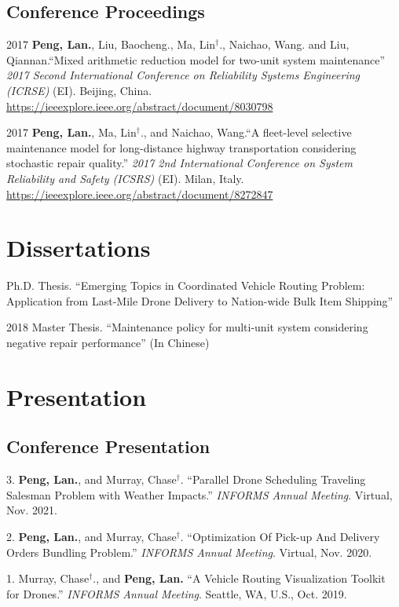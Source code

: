 \documentclass[12pt,letterpaper]{report}
\begin{document}
    \subsection*{Conference Proceedings}
    \begin{tablist}
        \item[2017] \tab{}\textbf{Peng, Lan.}, Liu, Baocheng., Ma, Lin$^\dagger$., Naichao, Wang. and Liu, Qiannan.\enquote{Mixed arithmetic reduction model for two-unit system maintenance} \textit{2017 Second International Conference on Reliability Systems Engineering (ICRSE)} (EI). Beijing, China. \href{https://ieeexplore.ieee.org/abstract/document/8030798}{https://ieeexplore.ieee.org/abstract/document/8030798}
        
        \item[2017] \tab{}\textbf{Peng, Lan.}, Ma, Lin$^\dagger$., and Naichao, Wang.\enquote{A fleet-level selective maintenance model for long-distance highway transportation considering stochastic repair quality.} \textit{2017 2nd International Conference on System Reliability and Safety (ICSRS)} (EI). Milan, Italy. \href{https://ieeexplore.ieee.org/abstract/document/8272847}{https://ieeexplore.ieee.org/abstract/document/8272847}
    \end{tablist}

    \section*{Dissertations}
    \begin{tablist}
        \item[\the\year] \tab{} Ph.D. Thesis. \enquote{Emerging Topics in Coordinated Vehicle Routing Problem: Application from Last-Mile Drone Delivery to Nation-wide Bulk Item Shipping}
        \item[2018] \tab{} Master Thesis. \enquote{Maintenance policy for multi-unit system considering negative repair performance} (In Chinese)
    \end{tablist}

    \section*{Presentation}
    \subsection*{Conference Presentation}
    \begin{tablist}
        \item[3.] \tab{}\textbf{Peng, Lan.}, and Murray, Chase$^\dagger$. \enquote{Parallel Drone Scheduling Traveling Salesman Problem with Weather Impacts.} \textit{INFORMS Annual Meeting}. Virtual, Nov. 2021.
        \item[2.] \tab{}\textbf{Peng, Lan.}, and Murray, Chase$^\dagger$. \enquote{Optimization Of Pick-up And Delivery Orders Bundling Problem.} \textit{INFORMS Annual Meeting}. Virtual, Nov. 2020.
        \item[1.] \tab{}Murray, Chase$^\dagger$., and \textbf{Peng, Lan.} \enquote{A Vehicle Routing Visualization Toolkit for Drones.} \textit{INFORMS Annual Meeting}. Seattle, WA, U.S., Oct. 2019.
    \end{tablist}
\end{document}
